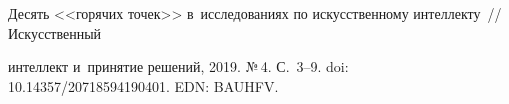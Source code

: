 \begin{multicols}{2}
\vspace*{-9pt}
  
{\small\frenchspacing
 { %
 \begin{thebibliography}{99}
 
 \vspace*{-3pt}
 
    Десять <<горячих точек>> в~исследованиях по искусственному 
интеллекту~// Искусственный\linebreak\vspace*{-12pt}

\columnbreak

\noindent
 интеллект и~принятие решений, 2019. №\,4. С.~3--9. doi: 
10.14357/20718594190401. EDN: BAUHFV.
  

\end{thebibliography}}}
\end{multicols}
